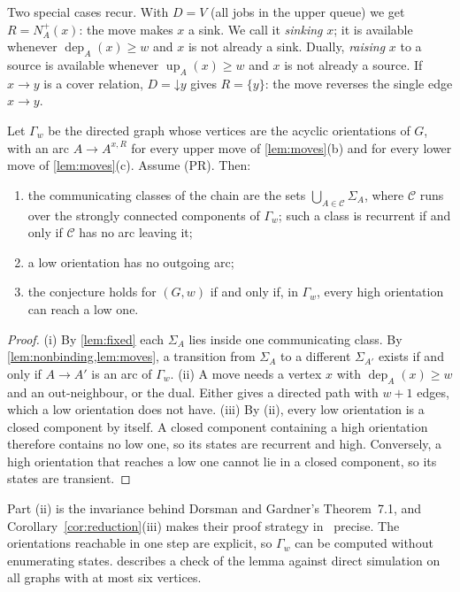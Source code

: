 \documentclass[11pt,a4paper]{article}
\theoremstyle{plain}
\theoremstyle{plain}
\newcommand{\dep}{\operatorname{dep}}
\newcommand{\up}{\operatorname{up}}
\newcommand{\Nout}{N^{+}}
\newcommand{\G}{\Gamma}
\newcommand{\Sg}{\Sigma}
\begin{document}
Two special cases recur. With $D=V$ (all jobs in the upper queue) we get $R=\Nout_A(x)$: the move makes $x$ a sink. We call it \emph{sinking} $x$; it is available whenever $\dep_A(x)\ge w$ and $x$ is not already a sink. Dually, \emph{raising} $x$ to a source is available whenever $\up_A(x)\ge w$ and $x$ is not already a source. If $x\to y$ is a cover relation, $D=\mathord{\downarrow}y$ gives $R=\{y\}$: the move reverses the single edge $x\to y$.

\begin{corollary}\label{cor:reduction}
Let $\G_w$ be the directed graph whose vertices are the acyclic orientations of $G$, with an arc $A\to A^{x,R}$ for every upper move of \cref{lem:moves}(b) and for every lower move of \cref{lem:moves}(c). Assume (PR). Then:
\begin{enumerate}[label=(\roman*)]
\item the communicating classes of the chain are the sets $\bigcup_{A\in\mathcal{C}}\Sg_A$, where $\mathcal{C}$ runs over the strongly connected components of $\G_w$; such a class is recurrent if and only if $\mathcal{C}$ has no arc leaving it;
\item a low orientation has no outgoing arc;
\item the conjecture holds for $(G,w)$ if and only if, in $\G_w$, every high orientation can reach a low one.
\end{enumerate}
\end{corollary}

\begin{proof}
(i) By \cref{lem:fixed} each $\Sg_A$ lies inside one communicating class. By \cref{lem:nonbinding,lem:moves}, a transition from $\Sg_A$ to a different $\Sg_{A'}$ exists if and only if $A\to A'$ is an arc of $\G_w$. (ii) A move needs a vertex $x$ with $\dep_A(x)\ge w$ and an out-neighbour, or the dual. Either gives a directed path with $w+1$ edges, which a low orientation does not have. (iii) By (ii), every low orientation is a closed component by itself. A closed component containing a high orientation therefore contains no low one, so its states are recurrent and high. Conversely, a high orientation that reaches a low one cannot lie in a closed component, so its states are transient.
\end{proof}

Part (ii) is the invariance behind Dorsman and Gardner's Theorem~7.1, and Corollary~\ref{cor:reduction}(iii) makes their proof strategy in~\cite[Appendix~C.2]{DG2024} precise. The orientations reachable in one step are explicit, so $\G_w$ can be computed without enumerating states.  describes a check of the lemma against direct simulation on all graphs with at most six vertices.
\end{document}
